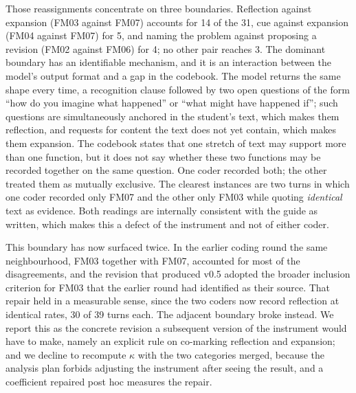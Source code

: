 \documentclass{sbc2023}%
\begin{document}
Those reassignments concentrate on three boundaries. Reflection against expansion (FM03 against FM07) accounts for 14 of the 31, cue against expansion (FM04 against FM07) for 5, and naming the problem against proposing a revision (FM02 against FM06) for 4; no other pair reaches 3. The dominant boundary has an identifiable mechanism, and it is an interaction between the model's output format and a gap in the codebook. The model returns the same shape every time, a recognition clause followed by two open questions of the form ``how do you imagine what happened'' or ``what might have happened if''; such questions are simultaneously anchored in the student's text, which makes them reflection, and requests for content the text does not yet contain, which makes them expansion. The codebook states that one stretch of text may support more than one function, but it does not say whether these two functions may be recorded together on the same question. One coder recorded both; the other treated them as mutually exclusive. The clearest instances are two turns in which one coder recorded only FM07 and the other only FM03 while quoting \textit{identical} text as evidence. Both readings are internally consistent with the guide as written, which makes this a defect of the instrument and not of either coder.

This boundary has now surfaced twice. In the earlier coding round the same neighbourhood, FM03 together with FM07, accounted for most of the disagreements, and the revision that produced v0.5 adopted the broader inclusion criterion for FM03 that the earlier round had identified as their source. That repair held in a measurable sense, since the two coders now record reflection at identical rates, 30 of 39 turns each. The adjacent boundary broke instead. We report this as the concrete revision a subsequent version of the instrument would have to make, namely an explicit rule on co-marking reflection and expansion; and we decline to recompute $\kappa$ with the two categories merged, because the analysis plan forbids adjusting the instrument after seeing the result, and a coefficient repaired post hoc measures the repair.
\end{document}
